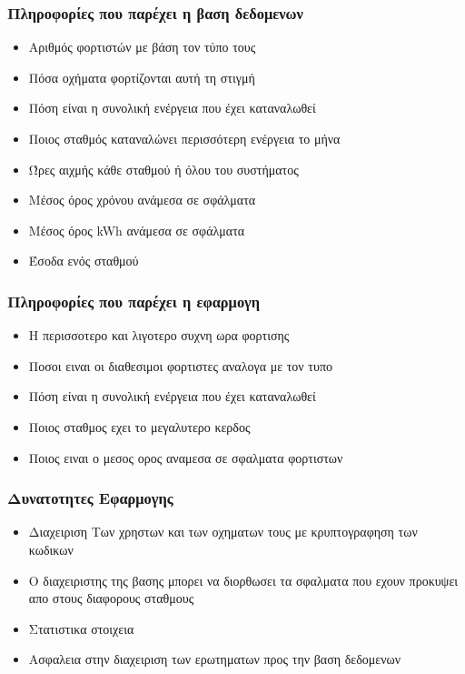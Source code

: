 \documentclass[10pt]{beamer}
\begin{document}
\begin{frame}
    \frametitle{Πληροφορίες που παρέχει η βαση δεδομενων}

    \begin{itemize}
        \item Αριθμός φορτιστών με βάση τον τύπο τους
        \item Πόσα οχήματα φορτίζονται αυτή τη στιγμή
        \item Πόση είναι η συνολική ενέργεια που έχει καταναλωθεί
        \item Ποιος σταθμός καταναλώνει περισσότερη ενέργεια το μήνα
        \item Ώρες αιχμής κάθε σταθμού ή όλου του συστήματος
        \item Μέσος όρος χρόνου ανάμεσα σε σφάλματα
        \item Μέσος όρος kWh ανάμεσα σε σφάλματα
        \item Έσοδα ενός σταθμού

    \end{itemize}
\end{frame}



\begin{frame}
    \frametitle{Πληροφορίες που παρέχει η εφαρμογη}

    \begin{itemize}
        \item Η περισσοτερο και λιγοτερο συχνη ωρα φορτισης
        \item Ποσοι ειναι οι διαθεσιμοι φορτιστες αναλογα με τον τυπο
        \item Πόση είναι η συνολική ενέργεια που έχει καταναλωθεί
        \item Ποιος σταθμος εχει το μεγαλυτερο κερδος
        \item Ποιος ειναι ο μεσος ορος αναμεσα σε σφαλματα φορτιστων
    \end{itemize}
\end{frame}

\begin{frame}
    \frametitle{Δυνατοτητες Εφαρμογης}
    \begin{itemize}
        \item Διαχειριση Των χρηστων και των οχηματων τους με κρυπτογραφηση των κωδικων 
        \item Ο διαχειριστης της βασης μπορει να διορθωσει τα σφαλματα που εχουν προκυψει απο στους διαφορους σταθμους 
        \item Στατιστικα στοιχεια 
        \item Ασφαλεια στην διαχειριση των ερωτηματων προς την βαση δεδομενων 
    \end{itemize}
\end{frame}
\end{document}
